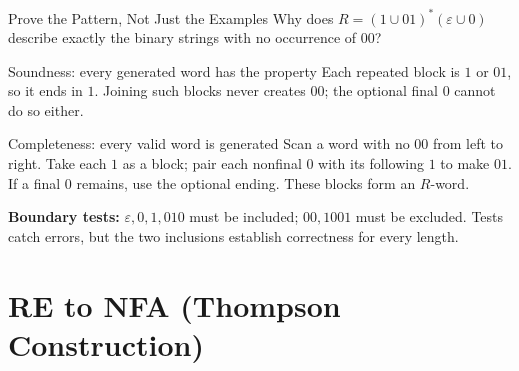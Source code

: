 \documentclass[10pt]{beamer}
\begin{document}
\begin{frame}{Prove the Pattern, Not Just the Examples}
  \small
  Why does $R=(1\cup01)^*(\varepsilon\cup0)$ describe exactly the binary
  strings with no occurrence of $00$?
  \begin{block}{Soundness: every generated word has the property}
    Each repeated block is $1$ or $01$, so it ends in $1$. Joining such
    blocks never creates $00$; the optional final $0$ cannot do so either.
  \end{block}
  \pause
  \begin{block}{Completeness: every valid word is generated}
    Scan a word with no $00$ from left to right. Take each $1$ as a block;
    pair each nonfinal $0$ with its following $1$ to make $01$. If a final
    $0$ remains, use the optional ending. These blocks form an $R$-word.
  \end{block}
  \pause
  \textbf{Boundary tests:} $\varepsilon,0,1,010$ must be included;
  $00,1001$ must be excluded. Tests catch errors, but the two inclusions
  establish correctness for every length.
\end{frame}

\section{RE to NFA (Thompson Construction)}
\end{document}
